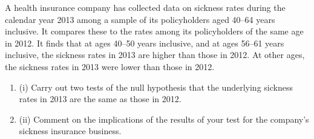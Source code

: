 \documentclass[a4paper,12pt]{article}
\begin{document}
A health insurance company has collected data on sickness rates during the calendar
year 2013 among a sample of its policyholders aged 40–64 years inclusive. It
compares these to the rates among its policyholders of the same age in 2012. It finds
that at ages 40–50 years inclusive, and at ages 56–61 years inclusive, the sickness
rates in 2013 are higher than those in 2012. At other ages, the sickness rates in 2013
were lower than those in 2012.
\begin{enumerate}
\item (i) Carry out two tests of the null hypothesis that the underlying sickness rates in
2013 are the same as those in 2012.
\item  (ii) Comment on the implications of the results of your test for the company’s
sickness insurance business.
\end{enumerate}
\end{document}
